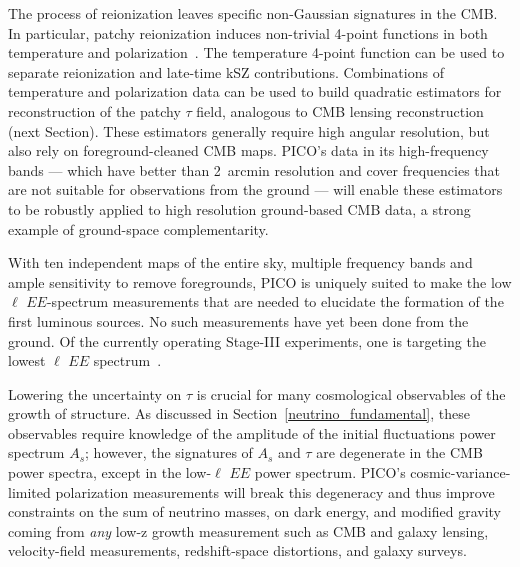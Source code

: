\documentclass[PICOReport.tex]{subfiles}
\begin{document}
The process of reionization leaves specific non-Gaussian signatures in the CMB.  In particular, patchy reionization induces non-trivial 4-point functions in both temperature and polarization~\citep{SmithFerraro2017,DvorkinSmith2009}.  The temperature 4-point function can be used to separate reionization and late-time kSZ contributions.  Combinations of temperature and polarization data can be used to build quadratic estimators for reconstruction of the patchy $\tau$ field, analogous to CMB lensing reconstruction (next Section).  These estimators generally require high angular resolution, but also rely on foreground-cleaned CMB maps.  PICO's data in its high-frequency bands --- which have better than 2~arcmin resolution and cover frequencies that are not suitable for observations from the ground --- will enable these estimators to be robustly applied to high resolution ground-based CMB data, a strong example of ground-space complementarity.  %
%

With ten independent maps of the entire sky, multiple frequency bands and ample sensitivity to remove foregrounds, PICO is uniquely suited to make the low $\ell$ $EE$-spectrum measurements that are needed to elucidate the formation of the first luminous sources. No such measurements have yet been done from the ground. Of the currently operating Stage-III experiments, one is targeting the lowest $\ell$ $EE$ spectrum~\citep{class}. 

Lowering the uncertainty on $\tau$ is crucial for many cosmological observables of the growth of structure. As discussed in Section~\ref{neutrino_fundamental}, these observables require knowledge of the amplitude of the initial fluctuations power spectrum $A_s$; however, the signatures of $A_{s}$ and $\tau$ are degenerate in the %
CMB power spectra, except in the low-$\ell$ $EE$ power spectrum.  PICO's cosmic-variance-limited polarization measurements will break this degeneracy and thus improve constraints on the sum of neutrino masses, on dark energy, and modified gravity coming from {\it any} low-z growth measurement such as CMB and galaxy lensing, velocity-field measurements, redshift-space distortions, and galaxy surveys. 
\end{document}
